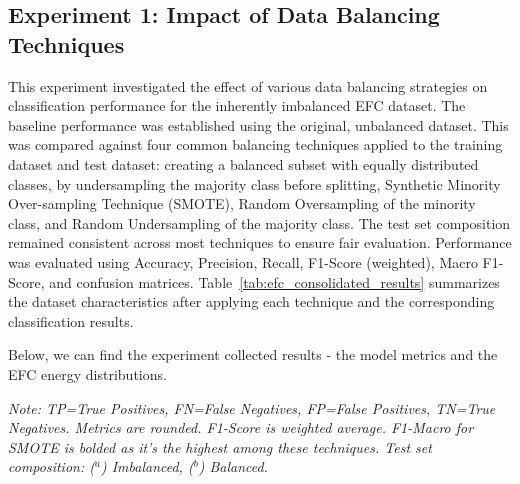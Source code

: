 \documentclass[12pt]{article}
\begin{document}
\subsection{Experiment 1: Impact of Data Balancing Techniques} \label{subsec:experiment_1}
This experiment investigated the effect of various data balancing strategies on classification performance for the inherently
imbalanced EFC dataset. The baseline performance was established using the original, unbalanced dataset. This was compared
against four common balancing techniques applied to the training dataset and test dataset: creating a balanced subset with
equally distributed classes, by undersampling the majority class before splitting, Synthetic Minority Over-sampling Technique
(SMOTE), Random Oversampling of the minority class, and Random Undersampling of the majority class. The test set composition
remained consistent across most techniques to ensure fair evaluation. Performance was evaluated using Accuracy, Precision,
Recall, F1-Score (weighted), Macro F1-Score, and confusion matrices. Table~\ref{tab:efc_consolidated_results} summarizes
the dataset characteristics after applying each technique and the corresponding classification results.

Below, we can find the experiment collected results - the model metrics and the EFC energy distributions.

\begin{table}[htbp]
  \centering
  \caption{EFC Performance Across Data Balancing Techniques (Experiment 1).}
  \label{tab:balancing_results}
  \par\medskip
  \footnotesize
  \textit{Note: TP=True Positives, FN=False Negatives, FP=False Positives, TN=True Negatives. Metrics are rounded. F1-Score
    is weighted average. F1-Macro for SMOTE is bolded as it's the highest among these techniques. Test set composition:
    ($^{a}$) Imbalanced, ($^{b}$) Balanced.}
\end{table}
\end{document}
